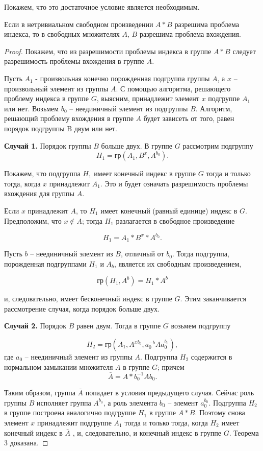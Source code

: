 \documentclass[twoside]{mfitjournal}
\begin{document}
Покажем, что это достаточное условие является необходимым.

\begin{theorem}[3]
Если в нетривиальном свободном произведении $A\ast B$ разрешима проблема индекса, то в свободных множителях $A$, $B$ разрешима проблема вхождения.
\end{theorem} 

\begin{proof}
Покажем, что из разрешимости проблемы индекса в группе $A\ast B$ следует разрешимость проблемы вхождения в группе  $A$.

Пусть $A_1$ - произвольная конечно порожденная подгруппа группы $A$, а $x$ – произвольный элемент из группы $A$. С помощью алгоритма, решающего проблему индекса в группе $G$, выясним, принадлежит элемент $x$ подгруппе $A_1$ или нет. Возьмем  $b_0$ – неединичный элемент из подгруппы $B$. Алгоритм, решающий проблему вхождения в группе $A$ будет зависеть от того, равен порядок подгруппы B двум или нет.

\textbf{Случай 1.} Порядок группы $B$ больше двух. В группе $G$ рассмотрим подгруппу
\[
H_1=\text{гр}(A_1,B^x,A^{b_0}).
\] 

Покажем, что подгруппа $H_1$ имеет конечный индекс в группе $G$ тогда и только тогда, когда $x$ принадлежит $A_1$. Это и будет означать разрешимость проблемы вхождения для группы $A$.

Если $x$ принадлежит $A$, то $H_1$ имеет конечный (равный единице) индекс в $G$. Предположим, что $x\notin A$; тогда $H_1$ разлагается в свободное произведение

\[
H_1=A_1\ast B^x\ast A^{b_0}.
\] 

Пусть $b$ – неединичный элемент из $B$, отличный от $b_0$. Тогда подгруппа, порожденная подгруппами $H_1$ и $A_b$, является их свободным произведением,

\[
\text{гр}(H_1,A^b)=H_1\ast A^b
\]

и, следовательно, имеет бесконечный индекс в группе $G$. Этим заканчивается рассмотрение случая, когда порядок больше двух.

\textbf{Случай 2.} Порядок $B$ равен двум. Тогда  в группе $G$ возьмем  подгруппу

\[
H_2=\text{гр}(A_1,A^{x b_0}, a_0^{-b}A a_0^{b_0}),  
\]
где $a_0$ -- неединичный элемент из группы $A$. Подгруппа $H_2$ содержится в нормальном замыкании множителя $A$ в группе $G$; причем
\[
\bar{A}=A\ast b_0^{-1}Ab_0.
\]

Таким образом, группа  $ \bar{A} $ попадает в условия предыдущего случая. Сейчас роль группы $B$ исполняет группа $ A^{b_0} $, а роль элемента $b_0$ – элемент  $a^{b_0}_0$. Подгруппа $H_2$ в группе   построена аналогично подгруппе $H_1$ в группе $A \ast B$. Поэтому снова элемент $x$ принадлежит подгруппе $A_1$ тогда и только тогда, когда $H_2$ имеет конечный индекс в $ \bar{A} $ , и, следовательно, и конечный индекс в группе $G$. Теорема 3 доказана. 

\end{proof}
\end{document}
